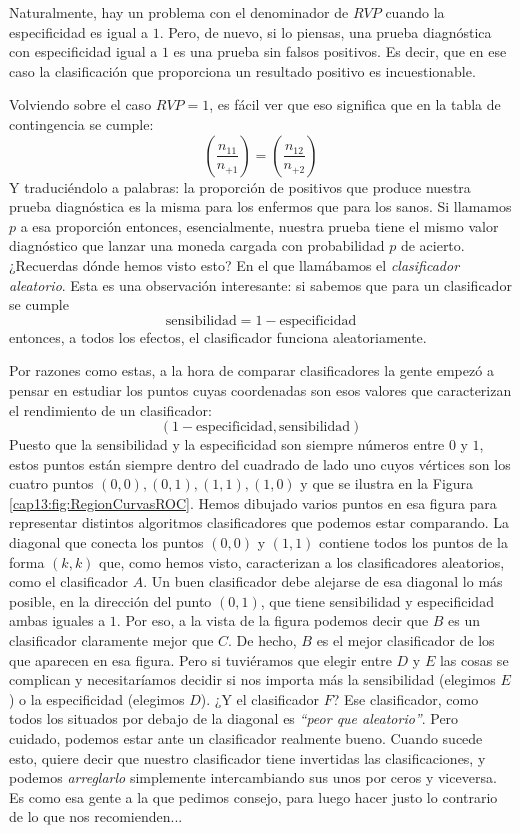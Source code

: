 Naturalmente, hay un problema con el denominador de $RVP$ cuando la especificidad es igual a $1$. Pero, de nuevo, si lo piensas, una prueba diagnóstica con especificidad igual a $1$ es una prueba sin falsos positivos. Es decir, que en ese caso la clasificación que proporciona un resultado positivo es incuestionable.

Volviendo sobre el caso $RVP=1$, es fácil ver que eso significa que en la tabla de contingencia se cumple:
\[
\left(\dfrac{n_{11}}{n_{+1}}\right) = \left(\dfrac{n_{12}}{n_{+2}}\right)
\]
Y traduciéndolo a palabras: la proporción de positivos que produce nuestra prueba diagnóstica es la misma para los enfermos que para los sanos. Si llamamos $p$ a esa proporción  entonces, esencialmente, nuestra prueba tiene el mismo valor diagnóstico que lanzar una moneda cargada con probabilidad $p$ de acierto. ¿Recuerdas dónde hemos visto esto? En el que llamábamos el {\em clasificador aleatorio}.  Esta es una observación interesante: si sabemos que para un clasificador se cumple
\[
\mbox{sensibilidad} = 1-\mbox{especificidad}
\]
entonces, a todos los efectos,  el clasificador funciona aleatoriamente.

Por razones como estas, a la hora de comparar clasificadores la gente empezó a pensar en estudiar los puntos cuyas coordenadas son esos valores que caracterizan el rendimiento de un clasificador:
\[
(1-\mbox{especificidad}, \mbox{sensibilidad} )
\]
Puesto que la sensibilidad y la especificidad son siempre números entre $0$ y $1$, estos puntos están siempre dentro del cuadrado de lado uno cuyos vértices son los cuatro puntos $(0, 0), (0, 1), (1, 1), (1, 0)$ y que se ilustra en la Figura \ref{cap13:fig:RegionCurvasROC}. Hemos dibujado varios puntos en esa figura para representar distintos algoritmos clasificadores que podemos estar comparando.  La diagonal que conecta los puntos $(0,0)$ y $(1, 1)$ contiene todos los puntos de la forma $(k, k)$ que, como hemos visto,  caracterizan a los clasificadores aleatorios, como el clasificador $A$.
Un buen clasificador debe alejarse de esa diagonal lo más posible, en la dirección del punto $(0, 1)$, que tiene sensibilidad y especificidad ambas iguales a $1$.  Por eso, a la vista de la figura podemos decir que $B$ es un clasificador claramente mejor que $C$. De hecho, $B$ es el mejor clasificador de los que aparecen en esa figura. Pero si  tuviéramos que elegir entre $D$ y $E$ las cosas se complican y necesitaríamos decidir si nos importa más la sensibilidad (elegimos $E$) o la especificidad (elegimos $D$).  ¿Y el clasificador $F$? Ese clasificador, como todos los situados por debajo de la diagonal es {\em ``peor que aleatorio''}. Pero cuidado, podemos estar ante un clasificador realmente bueno. Cuando sucede esto, quiere decir que nuestro clasificador tiene invertidas las clasificaciones, y podemos {\em arreglarlo} simplemente intercambiando sus unos por ceros y viceversa. Es como esa gente a la que pedimos consejo, para luego hacer justo lo contrario de lo que nos recomienden...

